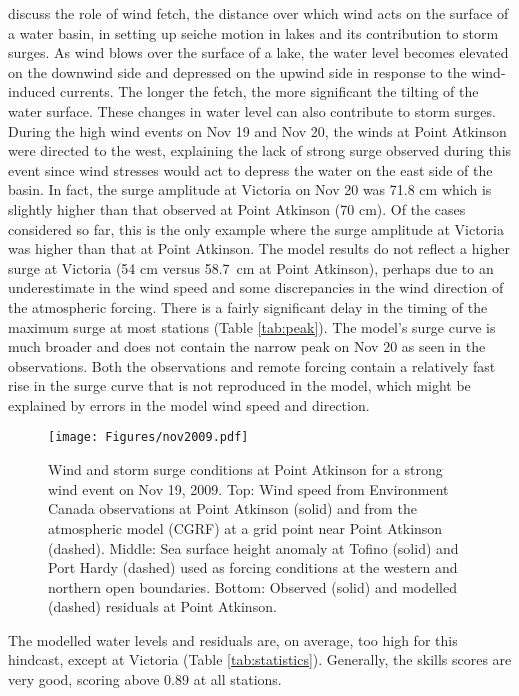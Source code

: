 \documentclass[letterpaper]{tATO2e}
\begin{document}
\citet{danard2003storm} discuss the role of wind fetch, the distance over which wind acts on the surface of a water basin, in setting up seiche motion in lakes and its contribution to storm surges. As wind blows over the surface of a lake, the water level becomes elevated on the downwind side and depressed on the upwind side in response to the wind-induced currents. The longer the fetch, the more significant the tilting of the water surface. These changes in water level can also contribute to storm surges.  During the high wind events on Nov 19 and Nov 20, the winds at Point Atkinson were directed to the west, explaining the lack of strong surge observed during this event since wind stresses would act to depress the water on the east side of the basin. In fact, the surge amplitude at Victoria on Nov 20 was {\color{red}71.8 cm} which is slightly higher than that observed at Point Atkinson {\color{red}(70 cm)}. Of the cases considered so far, this is the only example where the surge amplitude at Victoria was higher than that at Point Atkinson. The model results do not reflect a higher surge at Victoria {\color{red}(54 cm versus 58.7~cm at Point Atkinson)}, perhaps due to an underestimate in the wind speed and some discrepancies in the wind direction of the atmospheric forcing.  {\color{red} There is a fairly significant delay in the timing of the maximum surge at most stations (Table \ref{tab:peak}). The model's surge curve is much broader and does not contain the narrow peak on Nov 20 as seen in the observations. Both the observations and remote forcing contain a relatively fast rise in the surge curve that is not reproduced in the model, which might be explained by errors in the model wind speed and direction. }


\begin{figure}
\centering
\texttt{[image: Figures/nov2009.pdf]}
\caption{Wind and storm surge conditions at Point Atkinson for a strong wind event on Nov 19, 2009. Top: Wind speed from Environment Canada observations \citep{ECClimateArchive} at Point Atkinson (solid) and from the atmospheric model (CGRF) at a grid point near Point Atkinson (dashed). Middle: Sea surface height anomaly at Tofino (solid) and Port Hardy (dashed) used as forcing conditions at the western and northern open boundaries. Bottom: Observed (solid) and modelled (dashed) residuals at Point Atkinson.  }
\label{fig:nov2009}
\end{figure}

The modelled water levels and residuals are, {\color{red} on average,} too high for this hindcast, except at Victoria (Table \ref{tab:statistics}).  Generally, the skills scores are very good, scoring above {\color{red} 0.89} at all stations. 
\end{document}
